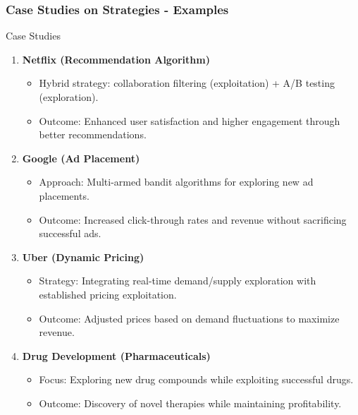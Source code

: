 \documentclass[aspectratio=169]{beamer}
\begin{document}
\begin{frame}[fragile]
    \frametitle{Case Studies on Strategies - Examples}
    \begin{block}{Case Studies}
        \begin{enumerate}
            \item \textbf{Netflix (Recommendation Algorithm)}
                \begin{itemize}
                    \item Hybrid strategy: collaboration filtering (exploitation) + A/B testing (exploration).
                    \item Outcome: Enhanced user satisfaction and higher engagement through better recommendations.
                \end{itemize}
            \item \textbf{Google (Ad Placement)}
                \begin{itemize}
                    \item Approach: Multi-armed bandit algorithms for exploring new ad placements.
                    \item Outcome: Increased click-through rates and revenue without sacrificing successful ads.
                \end{itemize}
            \item \textbf{Uber (Dynamic Pricing)}
                \begin{itemize}
                    \item Strategy: Integrating real-time demand/supply exploration with established pricing exploitation.
                    \item Outcome: Adjusted prices based on demand fluctuations to maximize revenue.
                \end{itemize}
            \item \textbf{Drug Development (Pharmaceuticals)}
                \begin{itemize}
                    \item Focus: Exploring new drug compounds while exploiting successful drugs.
                    \item Outcome: Discovery of novel therapies while maintaining profitability.
                \end{itemize}
        \end{enumerate}
    \end{block}
\end{frame}
\end{document}
